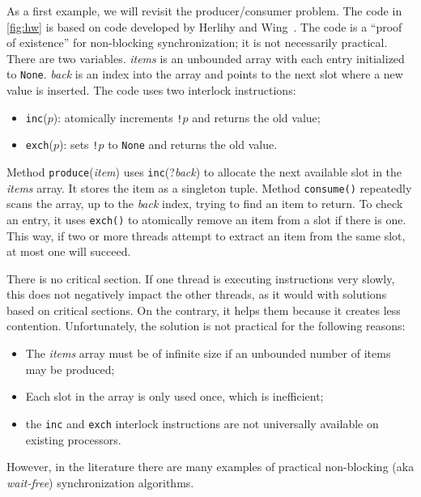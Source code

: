 \documentclass{report}
\begin{document}
As a first example, we will revisit the producer/consumer problem.
The code in \autoref{fig:hw} is based on code developed by Herlihy and
Wing~\cite{HW87}.
The code is a ``proof of existence'' for non-blocking synchronization; it
is not necessarily practical.
There are two variables.  \textit{items} is an unbounded array with each
entry initialized to \texttt{None}.  \textit{back} is an index into the
array and points to the next slot where a new value is inserted.
The code uses two interlock instructions:
\begin{itemize}
\item \texttt{inc}($p$): atomically increments \texttt{!}$p$ and returns
the old value;
\item \texttt{exch}($p$): sets \texttt{!}$p$ to \texttt{None} and returns
the old value.
\end{itemize}

Method \texttt{produce}(\textit{item}) uses \texttt{inc}(?\textit{back})
to allocate
the next available slot in the \textit{items} array.
It stores the item as a singleton tuple.
Method \texttt{consume()} repeatedly scans the array, up to the
\textit{back} index, trying to find an item to return.
To check an entry, it uses \texttt{exch()}
to atomically remove an item from a slot if there is one.
This way, if two or more threads attempt to extract an item from
the same slot, at most one will succeed.

There is no critical section.  If one thread is executing instructions
very slowly, this does not negatively impact the other threads, as it
would with solutions based on critical sections.
On the contrary, it helps them because it creates less contention.
Unfortunately, the solution is not practical for the following reasons:
\begin{itemize}
\item The \textit{items} array must be of infinite size if an unbounded number
of items may be produced;
\item Each slot in the array is only used once, which is inefficient;
\item the \texttt{inc} and \texttt{exch} interlock instructions are not
universally available on existing processors.
\end{itemize}
However, in the literature there are many examples of practical
non-blocking (aka \emph{wait-free})
%
synchronization algorithms.

\end{document}

